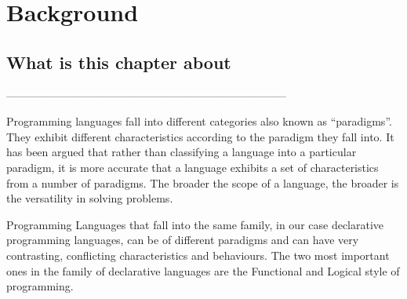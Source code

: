 \documentclass[thesis-solanki.tex]{subfiles}
\begin{document}
\chapter{Background}\label{chap:background}

\section{What is this chapter about}

-----------------------------------------------------------------------------

Programming languages fall into different categories also known as ``paradigms''.
They exhibit different characteristics according to the paradigm they fall into.
It has been argued \cite{Krishnamurthi:2008:TPL:1480828.1480846} that
rather than classifying a language into a particular paradigm,
it is
more accurate that a language exhibits a set of characteristics from a
number of paradigms.
The broader the scope of a language, the broader is the versatility in solving problems.

Programming Languages that fall into the same family, in our case declarative programming languages, can be of
different paradigms and can have very contrasting, conflicting characteristics and behaviours.
The two most important ones in the family of declarative languages are the Functional and Logical style of
programming.
\end{document}
